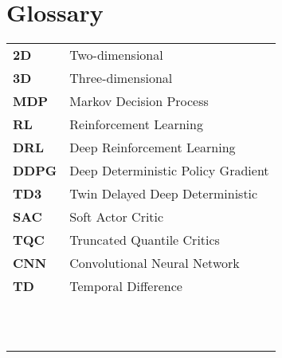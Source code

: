 %
\chapter*{Glossary}

\capstartfalse
\begin{table}[!hb]
    \begin{tabular}{ll}
        \textbf{2D}   & Two-dimensional                    \\
        \textbf{3D}   & Three-dimensional                  \\
        \textbf{MDP}  & Markov Decision Process            \\
        \textbf{RL}   & Reinforcement Learning             \\
        \textbf{DRL}  & Deep Reinforcement Learning        \\
        \textbf{DDPG} & Deep Deterministic Policy Gradient \\
        \textbf{TD3}  & Twin Delayed Deep Deterministic    \\
        \textbf{SAC}  & Soft Actor Critic                  \\
        \textbf{TQC}  & Truncated Quantile Critics         \\
        \textbf{CNN}  & Convolutional Neural Network       \\
        \textbf{TD}   & Temporal Difference                \\
        \textbf{}     &                                    \\
        \textbf{}     &                                    \\
        \textbf{}     &                                    \\
        \textbf{}     &                                    \\
        \textbf{}     &                                    \\
        \textbf{}     &                                    \\
        \textbf{}     &                                    \\
        \textbf{}     &                                    \\
        \textbf{}     &                                    \\
        \textbf{}     &                                    \\
        \textbf{}     &                                    \\

\end{tabular}
\end{table}
